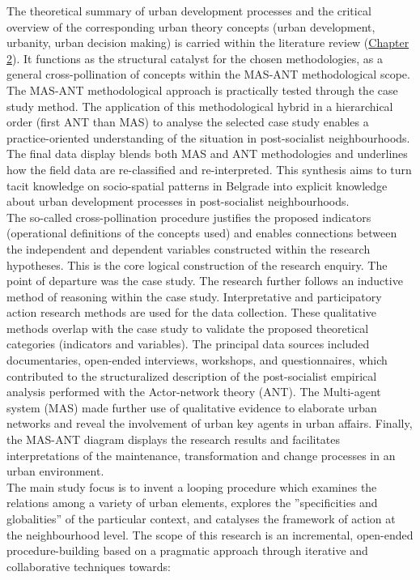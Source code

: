 \documentclass[11pt]{report}
\begin{document}
{{{{The theoretical summary of urban development processes and the critical overview of the corresponding urban theory concepts (urban development, urbanity, urban decision making) is carried within the literature review  (\href{Chapter 2}{Chapter 2}). It functions as the structural catalyst for the chosen methodologies, as a general cross-pollination of concepts within the MAS-ANT methodological scope. The MAS-ANT methodological approach is practically tested through the case study method. The application of this methodological hybrid in a hierarchical order (first ANT than MAS) to analyse the selected case study enables a practice-oriented understanding of the situation in post-socialist neighbourhoods. The final data display blends both MAS and ANT methodologies and underlines how the field data are re-classified and re-interpreted. This synthesis aims to turn tacit knowledge on socio-spatial patterns in Belgrade into explicit knowledge about urban development processes in post-socialist neighbourhoods.
\\

The so-called cross-pollination procedure justifies the proposed indicators (operational definitions of the concepts used) and enables connections between the independent and dependent variables constructed within the research hypotheses. This is the core logical construction of the research enquiry. The point of departure was the case study. The research further follows an inductive method of reasoning within the case study. Interpretative and participatory action research methods are used for the data collection. These qualitative methods overlap with the case study to validate the proposed theoretical categories (indicators and variables). The principal data sources included documentaries, open-ended interviews, workshops, and questionnaires, which contributed to the structuralized description of the post-socialist empirical analysis performed with the Actor-network theory (ANT). The Multi-agent system (MAS) made further use of qualitative evidence to elaborate urban networks and reveal the involvement of urban key agents in urban affairs. Finally, the MAS-ANT diagram displays the research results and facilitates interpretations of the maintenance, transformation and change processes in an urban environment.
\\

The main study focus is to invent a looping procedure which examines the relations among a variety of urban elements, explores the ”specificities and globalities” of the particular context, and catalyses the framework of action at the neighbourhood level.  The scope of this research is an incremental, open-ended procedure-building based on a pragmatic approach through iterative and collaborative techniques towards:

}}}}
\end{document}
